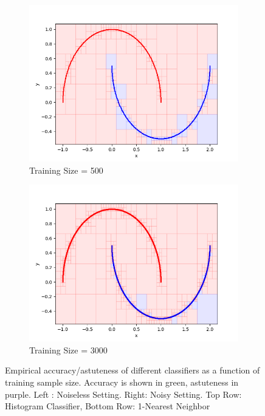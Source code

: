 \begin{figure}
\medskip
\begin{subfigure}{0.45\textwidth}
\includegraphics[width=\linewidth]{visual500}
\caption{Training Size = 500} 
\end{subfigure}\hspace*{\fill}
\begin{subfigure}{0.45\textwidth}
\includegraphics[width=\linewidth]{visual3000}
\caption{Training Size = 3000}
\end{subfigure}

\caption{Empirical accuracy/astuteness of different classifiers as a function of training sample size. Accuracy is shown in green, astuteness in purple. Left : Noiseless Setting. Right: Noisy Setting. Top Row: Histogram Classifier, Bottom Row: 1-Nearest Neighbor} \label{fig:appendix_fig}
\end{figure}


